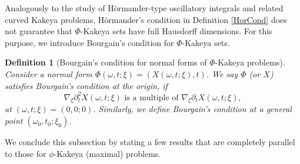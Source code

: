 \documentclass{article}
\numberwithin{equation}{section}
\theoremstyle{plain}
\newtheorem{definition}[theorem]{Definition}
\begin{document}
	 	 
	 
	 
	 
	 
	
Analogously to the study of H\"ormander-type oscillatory integrals and related curved Kakeya problems, H\"ormander's condition in Definition \ref{HorCond} does not guarantee that $\Phi$-Kakeya sets have full Hausdorff dimensions. For this purpose, we introduce Bourgain's condition for $\Phi$-Kakeya sets. 


%	
	
	\begin{definition}[Bourgain's condition for normal forms of $\Phi$-Kakeya problems]\label{BourCond}
		Consider a normal form $\Phi(\omega, t; \xi)=\left(X(\omega, t; \xi),t\right)$. We say $\Phi$ (or $X$) satisfies Bourgain's condition at the origin, if
		\begin{equation}
		\nabla_{\xi}\partial^2_t X(\omega, t; \xi) \text{ is a multiple of } \nabla_{\xi}\partial_t X(\omega, t; \xi),
		\end{equation}
		at $(\omega, t; \xi)=(0,0;0)$. Similarly, we define Bourgain's condition at a general point $(\omega_0, t_0; \xi_0)$.
	\end{definition}
	








We conclude this subsection by stating a few results that are completely parallel to those for $\phi$-Kakeya (maximal) problems. 
\end{document}

